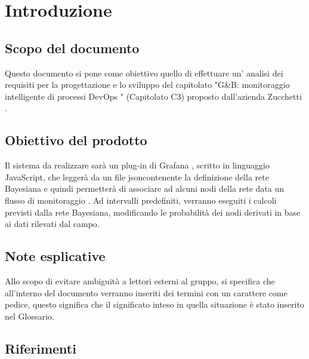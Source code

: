 \section{Introduzione}
		\subsection{Scopo del documento}			
Questo documento si pone come obiettivo quello di effettuare un' analisi dei requisiti per la progettazione e lo sviluppo del capitolato \pedice "G\&B: monitoraggio intelligente di processi DevOps \pedice" (Capitolato C3) proposto dall'azienda Zucchetti \pedice.


		\subsection{Obiettivo del prodotto}

Il sistema da realizzare sarà  un plug-in \pedice di Grafana \pedice, scritto in linguaggio JavaScript\pedice, che leggerà da un file json\pedice contenente la definizione della rete Bayesiana \pedice e quindi permetterà di associare ad alcuni nodi della rete data un flusso di monitoraggio \pedice.
Ad intervalli predefiniti, verranno eseguiti i calcoli previsti dalla rete Bayesiana, modificando le probabilità dei nodi derivati in base ai dati rilevati dal campo.


		\subsection{Note esplicative}

Allo scopo di evitare ambiguità a lettori esterni al gruppo, si specifica che all'interno del documento verranno inseriti dei termini con un carattere \pedice come pedice, questo significa che il significato inteso in quella situazione è stato inserito nel Glossario.


		\subsection{Riferimenti }

